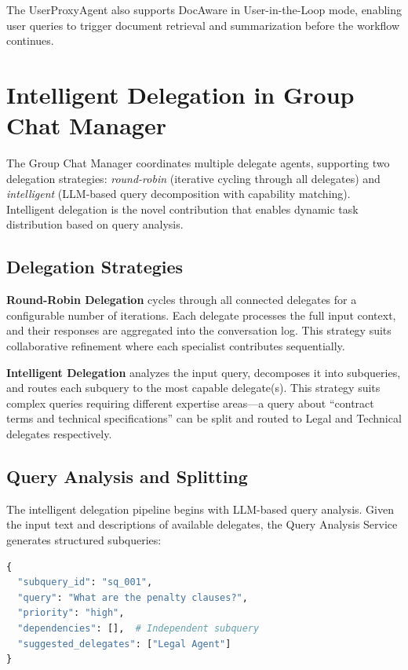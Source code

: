 \documentclass[11pt]{article}
\begin{document}
The UserProxyAgent also supports DocAware in User-in-the-Loop mode, enabling user queries to trigger document retrieval and summarization before the workflow continues.


\section{Intelligent Delegation in Group Chat Manager}
\label{sec:delegation}

The Group Chat Manager coordinates multiple delegate agents, supporting two delegation strategies: \textit{round-robin} (iterative cycling through all delegates) and \textit{intelligent} (LLM-based query decomposition with capability matching). Intelligent delegation is the novel contribution that enables dynamic task distribution based on query analysis.

\subsection{Delegation Strategies}

\textbf{Round-Robin Delegation} cycles through all connected delegates for a configurable number of iterations. Each delegate processes the full input context, and their responses are aggregated into the conversation log. This strategy suits collaborative refinement where each specialist contributes sequentially.

\textbf{Intelligent Delegation} analyzes the input query, decomposes it into subqueries, and routes each subquery to the most capable delegate(s). This strategy suits complex queries requiring different expertise areas—a query about ``contract terms and technical specifications'' can be split and routed to Legal and Technical delegates respectively.

\subsection{Query Analysis and Splitting}

The intelligent delegation pipeline begins with LLM-based query analysis. Given the input text and descriptions of available delegates, the Query Analysis Service generates structured subqueries:

\begin{lstlisting}[language=Python,caption={Subquery structure from query analysis}]
{
  "subquery_id": "sq_001",
  "query": "What are the penalty clauses?",
  "priority": "high",
  "dependencies": [],  # Independent subquery
  "suggested_delegates": ["Legal Agent"]
}
\end{lstlisting}
\end{document}
